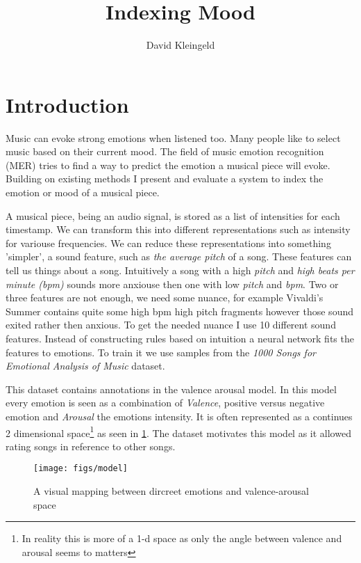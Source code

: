 \documentclass[lang=en, hanging-titles=true]{skrapport}
\title{Indexing Mood}
\author[dskleingeld@gmail.com]{David Kleingeld}
\begin{document}
\maketitle
\tableofcontents

\section{Introduction}
Music can evoke strong emotions when listened too. Many people like to select music based on their current mood. The field of music emotion recognition (MER) tries to find a way to predict the emotion a musical piece will evoke. Building on existing methods I present and evaluate a system to index the emotion or mood of a musical piece.

A musical piece, being an audio signal, is stored as a list of intensities for each timestamp. We can transform this into different representations such as intensity for variouse frequencies. We can reduce these representations into something 'simpler', a sound feature, such as \textit{the average pitch} of a song. These features can tell us things about a song. Intuitively a song with a high \textit{pitch} and \textit{high beats per minute (bpm)} sounds more anxiouse then one with low \textit{pitch} and \textit{bpm}. Two or three features are not enough, we need some nuance, for example Vivaldi's Summer contains quite some high bpm high pitch fragments however those sound exited rather then anxious. To get the needed nuance I use 10 different sound features. Instead of constructing rules based on intuition a neural network fits the features to emotions. To train it we use samples from the \textit{1000 Songs for Emotional Analysis of Music}\cite{dataset} dataset.

This dataset contains annotations in the valence arousal model. In this model every emotion is seen as a combination of \textit{Valence}, positive versus negative emotion and \textit{Arousal} the emotions intensity. It is often represented as a continues 2 dimensional space\footnote{In reality this is more of a 1-d space as only the angle between valence and arousal seems to matters} as seen in \cref{fig:model}. The dataset motivates this model as it allowed rating songs in reference to other songs.

\begin{figure}[htbp]
	\centering
	\texttt{[image: figs/model]}
	\caption{A visual mapping between dircreet emotions and valence-arousal space}
	\label{fig:model}
\end{figure}
\end{document}
